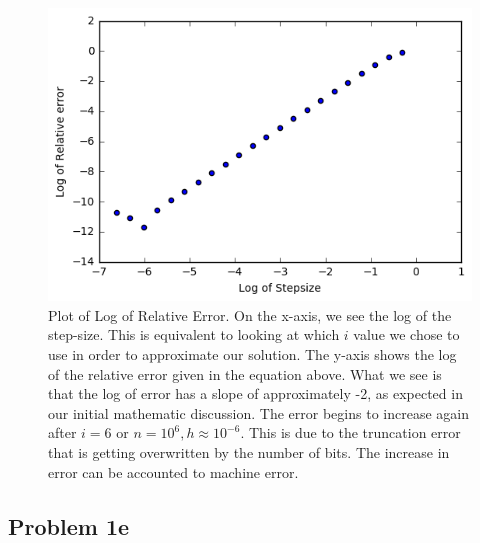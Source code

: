 \documentclass{article}
\begin{document}
\begin{figure}[h!]
	\includegraphics[width=\linewidth]{PHY480_P1_RerrvSs.png}
	\caption{Plot of Log of Relative Error. On the x-axis, we see the log of the step-size. This is equivalent to looking at which $i$ value we chose to use in order to approximate our solution. The y-axis shows the log of the relative error given in the equation above. What we see is that the log of error has a slope of approximately -2, as expected in our initial mathematic discussion. The error begins to increase again after $i=6$ or $n=10^{6}, h \approx 10^{-6}$. This is due to the truncation error that is getting overwritten by the number of bits. The increase in error can be accounted to machine error.}
	\label{fig:errorplot}
\end{figure}


\subsection{Problem 1e}
\end{document}
